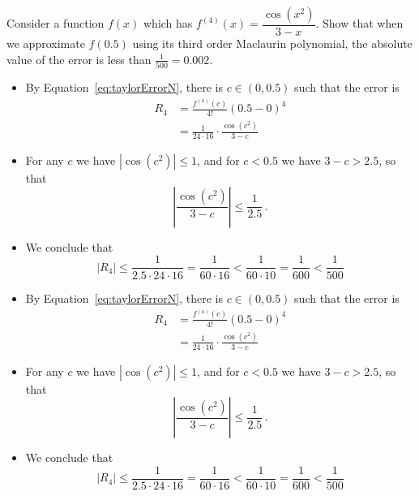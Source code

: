 




\begin{Mquestion}[2015Q]
Consider a function $f(x)$ which has $f^{(4)}(x)=\dfrac{\cos(x^2)}{3-x}$.  Show
that when we approximate $f(0.5)$ using its third order Maclaurin polynomial,
the absolute value of the error is less than $\frac{1}{500}=0.002$.
\end{Mquestion}
\begin{answer}
\begin{itemize}
 \item By Equation~\ref*{eq:taylorErrorN}, there is $c\in(0,0.5)$ such
that the error is
\begin{align*}
  R_4 &= \frac{f^{(4)}(c)}{4!} (0.5-0)^4 \\
      &= \frac{1}{24\cdot 16} \cdot \frac{\cos(c^2)}{3-c}
\end{align*}

\item For any $c$ we have $|\cos(c^2)| \leq 1$, and for $c<0.5$ we have
$3-c>2.5$,
so that $$\left|\frac{\cos(c^2)}{3-c}\right| \leq \frac{1}{2.5}\,.$$

\item We conclude that
$$ \left| R_4 \right| \leq \frac{1}{2.5\cdot 24\cdot 16} = \frac{1}{60\cdot 16}<\frac{1}{60\cdot 10}=\frac{1}{600}<\frac{1}{500}$$
\end{itemize}
\end{answer}
\begin{solution}
\begin{itemize}
 \item By Equation~\ref*{eq:taylorErrorN}, there is $c\in(0,0.5)$ such
that the error is
\begin{align*}
  R_4 &= \frac{f^{(4)}(c)}{4!} (0.5-0)^4 \\
      &= \frac{1}{24\cdot 16} \cdot \frac{\cos(c^2)}{3-c}
\end{align*}

\item For any $c$ we have $|\cos(c^2)| \leq 1$, and for $c<0.5$ we have
$3-c>2.5$,
so that $$\left|\frac{\cos(c^2)}{3-c}\right| \leq \frac{1}{2.5}\,.$$

\item We conclude that
$$ \left| R_4 \right| \leq \frac{1}{2.5\cdot 24\cdot 16} = \frac{1}{60\cdot 16}<\frac{1}{60\cdot 10}=\frac{1}{600}<\frac{1}{500}$$
\end{itemize}
\end{solution}



